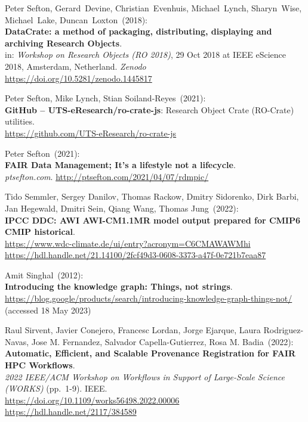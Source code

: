 \begin{thebibliography}{9}
Peter Sefton, Gerard~Devine, Christian~Evenhuis, Michael~Lynch, Sharyn~Wise,
Michael~Lake, Duncan~Loxton~(2018): \\
\textbf{DataCrate: a method of packaging, distributing, displaying and
archiving Research Objects}.\\
in: \emph{Workshop on Research Objects (RO 2018)}, 29 Oct 2018 at IEEE
eScience 2018, Amsterdam, Netherland. \emph{Zenodo}\\
\url{https://doi.org/10.5281/zenodo.1445817}

Peter Sefton, Mike Lynch, Stian Soiland-Reyes~(2021): \\
\textbf{GitHub -- UTS-eResearch/ro-crate-js}: Research Object Crate
(RO-Crate) utilities.\\
\url{https://github.com/UTS-eResearch/ro-crate-js}

Peter Sefton~(2021): \\
\textbf{FAIR Data Management; It's a lifestyle not a lifecycle}.\\
\emph{ptsefton.com}. \url{http://ptsefton.com/2021/04/07/rdmpic/}

Tido Semmler, Sergey Danilov, Thomas Rackow, Dmitry Sidorenko, Dirk
Barbi, Jan Hegewald, Dmitri Sein, Qiang Wang, Thomas Jung~(2022): \\
\textbf{IPCC DDC: AWI AWI-CM1.1MR model output prepared for CMIP6 CMIP
historical}. \\
\url{https://www.wdc-climate.de/ui/entry?acronym=C6CMAWAWMhi}\\
\url{https://hdl.handle.net/21.14100/2fcf49d3-0608-3373-a47f-0e721b7eaa87}

Amit Singhal~(2012): \\
\textbf{Introducing the knowledge graph: Things, not strings}.\\
\url{https://blog.google/products/search/introducing-knowledge-graph-things-not/}
(accessed 18 May 2023)

Raul Sirvent, Javier Conejero, Francesc Lordan, Jorge Ejarque, Laura Rodriguez-Navas, Jose M. Fernandez, Salvador Capella-Gutierrez, Rosa M. Badia~(2022): \\
\textbf{Automatic, Efficient, and Scalable Provenance Registration for
FAIR HPC Workflows}.\\
\emph{2022 IEEE/ACM Workshop on Workflows in Support of Large-Scale Science (WORKS)} (pp.~1-9). IEEE.\\
\url{https://doi.org/10.1109/works56498.2022.00006}\\
\url{https://hdl.handle.net/2117/384589}


\end{thebibliography}
